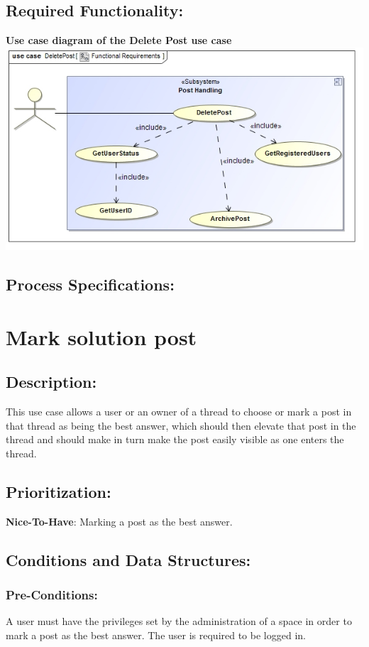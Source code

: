 \documentclass[a4paper,11pt]{article}
\begin{document}
\subsection{Required Functionality:} 
\textbf{Use case diagram of the Delete Post use case}\\
\includegraphics[width=1\linewidth]{./Images/PostHandling/postDeletion.jpg}\\
\subsection{Process Specifications:} 

\section{Mark solution post}
\subsection*{Description:}
This use case allows a user or an owner of a thread to choose or mark a post in that thread as being the best answer, which should then elevate that post in the thread and should make in turn make the post easily visible as one enters the thread.
\subsection{Prioritization:} 
\textbf{Nice-To-Have}: Marking a post as the best answer.
\subsection{Conditions and Data Structures:}
\subsubsection*{Pre-Conditions:}
A user must have the privileges set by the administration of a space in order to mark a post as the best answer. The user is required to be logged in.
\end{document}
